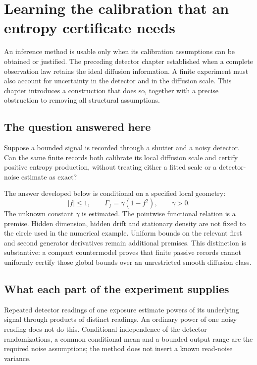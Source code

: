 \chapter{Learning the calibration that an entropy certificate needs}
\label{ch:dc-entry}

An inference method is usable only when its calibration assumptions can be
obtained or justified. The preceding detector chapter established when a
complete observation law retains the ideal diffusion information. A finite
experiment must also account for uncertainty in the detector and in the
diffusion scale. This chapter introduces a construction that does so, together
with a precise obstruction to removing all structural assumptions.

\section{The question answered here}

Suppose a bounded signal is recorded through a shutter and a noisy detector.
Can the same finite records both calibrate its local diffusion scale and
certify positive entropy production, without treating either a fitted scale or
a detector-noise estimate as exact?

The answer developed below is conditional on a specified local geometry:
\[
 |f|\leq1,\qquad \Gamma_f=\gamma(1-f^2),\qquad \gamma>0.
\]
The unknown constant $\gamma$ is estimated. The pointwise functional relation
is a premise. Hidden dimension, hidden drift and stationary density are not
fixed to the circle used in the numerical example. Uniform bounds on the
relevant first and second generator derivatives remain additional premises.
This distinction is substantive: a compact countermodel proves that finite
passive records cannot uniformly certify those global bounds over an
unrestricted smooth diffusion class.

\section{What each part of the experiment supplies}

Repeated detector readings of one exposure estimate powers of its underlying
signal through products of distinct readings. An ordinary power of one noisy
reading does not do this. Conditional independence of the detector
randomizations, a common conditional mean and a bounded output range are the
required noise assumptions; the method does not insert a known read-noise
variance.

